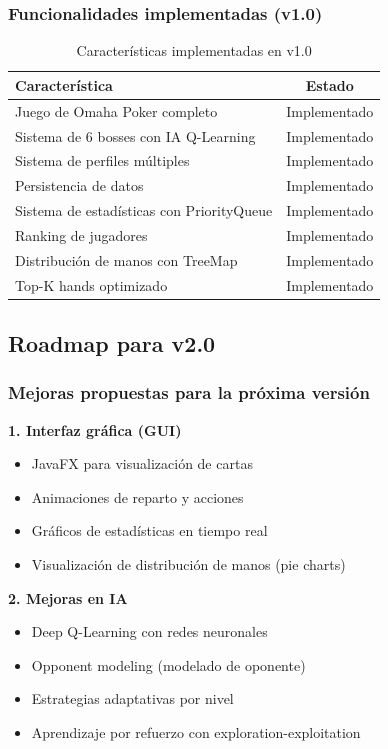 \documentclass[12pt,a4paper]{article}
\begin{document}
\subsubsection{Funcionalidades implementadas (v1.0)}

\begin{table}[H]
\centering
\begin{tabular}{|l|c|}
\hline
\textbf{Característica} & \textbf{Estado} \\
\hline
Juego de Omaha Poker completo & Implementado \\
Sistema de 6 bosses con IA Q-Learning & Implementado \\
Sistema de perfiles múltiples & Implementado \\
Persistencia de datos & Implementado \\
Sistema de estadísticas con PriorityQueue & Implementado \\
Ranking de jugadores & Implementado \\
Distribución de manos con TreeMap & Implementado \\
Top-K hands optimizado & Implementado \\
\hline
\end{tabular}
\caption{Características implementadas en v1.0}
\end{table}

\subsection{Roadmap para v2.0}

\subsubsection{Mejoras propuestas para la próxima versión}

\textbf{1. Interfaz gráfica (GUI)}
\begin{itemize}
    \item JavaFX para visualización de cartas
    \item Animaciones de reparto y acciones
    \item Gráficos de estadísticas en tiempo real
    \item Visualización de distribución de manos (pie charts)
\end{itemize}

\textbf{2. Mejoras en IA}
\begin{itemize}
    \item Deep Q-Learning con redes neuronales
    \item Opponent modeling (modelado de oponente)
    \item Estrategias adaptativas por nivel
    \item Aprendizaje por refuerzo con exploration-exploitation
\end{itemize}
\end{document}
